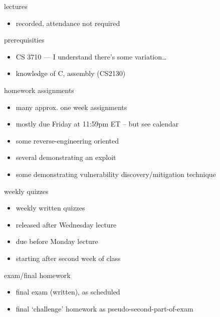 \begin{frame}{lectures}
    \begin{itemize}
    \item recorded, attendance not required
    \end{itemize}
\end{frame}

\begin{frame}{prerequisities}
    \begin{itemize}
    \item CS 3710 --- I understand there's some variation\ldots
    \item knowledge of C, assembly (CS2130)
    \end{itemize}
\end{frame}

\begin{frame}{homework assignments}
\begin{itemize}
    \item many approx. one week assignments
    \item mostly due Friday at 11:59pm ET -- but see calendar
    \vspace{.5cm}
    \item some reverse-engineering oriented
    \item several demonstrating an exploit
    \item some demonstrating vulnerability discovery/mitigation technique
\end{itemize}
\end{frame}

\begin{frame}{weekly quizzes}
\begin{itemize}
    \item weekly written quizzes
    \item released after Wednesday lecture
    \item due before Monday lecture
    \item starting after second week of class
\end{itemize}
\end{frame}

\begin{frame}{exam/final homework}
    \begin{itemize}
    \item final exam (written), as scheduled
    \item final `challenge' homework as pseudo-second-part-of-exam
    \end{itemize}
\end{frame}

